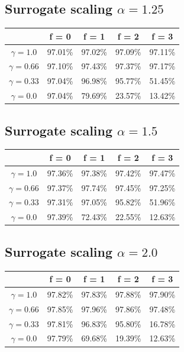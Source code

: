 \documentclass{article}
\begin{document}
\subsection{Surrogate scaling $\alpha = 1.25$}
\begin{table}[htbp]
    \centering
    \begin{tabular}{ccccc}
        \toprule
        & \textbf{f = 0} & \textbf{f = 1} & \textbf{f = 2} & \textbf{f = 3} \\
        \midrule
        $\gamma = 1.0$ & 97.01\% & 97.02\% & 97.09\% & 97.11\% \\
        $\gamma = 0.66$ & 97.10\% & 97.43\% & 97.37\% & 97.17\% \\
        $\gamma = 0.33$ & 97.04\% & 96.98\% & 95.77\% & 51.45\% \\
        $\gamma = 0.0$ & 97.04\% & 79.69\% & 23.57\% & 13.42\% \\
        \bottomrule
    \end{tabular}
\end{table}
\subsection{Surrogate scaling $\alpha = 1.5$}
\begin{table}[htbp]
    \centering
    \begin{tabular}{ccccc}
        \toprule
        & \textbf{f = 0} & \textbf{f = 1} & \textbf{f = 2} & \textbf{f = 3} \\
        \midrule
        $\gamma = 1.0$ & 97.36\% & 97.38\% & 97.42\% & 97.47\% \\
        $\gamma = 0.66$ & 97.37\% & 97.74\% & 97.45\% & 97.25\% \\
        $\gamma = 0.33$ & 97.31\% & 97.05\% & 95.82\% & 51.96\% \\
        $\gamma = 0.0$ & 97.39\% & 72.43\% & 22.55\% & 12.63\% \\
        \bottomrule
    \end{tabular}
\end{table}
\subsection{Surrogate scaling $\alpha = 2.0$}
\begin{table}[htbp]
    \centering
    \begin{tabular}{ccccc}
        \toprule
        & \textbf{f = 0} & \textbf{f = 1} & \textbf{f = 2} & \textbf{f = 3} \\
        \midrule
        $\gamma = 1.0$ & 97.82\% & 97.83\% & 97.88\% & 97.90\% \\
        $\gamma = 0.66$ & 97.85\% & 97.96\% & 97.86\% & 97.48\% \\
        $\gamma = 0.33$ & 97.81\% & 96.83\% & 95.80\% & 16.78\% \\
        $\gamma = 0.0$ & 97.79\% & 69.68\% & 19.39\% & 12.63\% \\
        \bottomrule
    \end{tabular}
\end{table}
\end{document}
